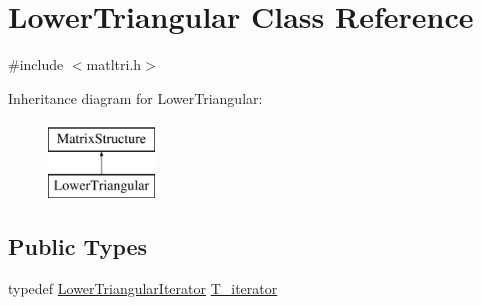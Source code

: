 \hypertarget{classLowerTriangular}{}\section{Lower\+Triangular Class Reference}
\label{classLowerTriangular}


{\ttfamily \#include $<$matltri.\+h$>$}

Inheritance diagram for Lower\+Triangular\+:\begin{figure}[H]
\begin{center}
\leavevmode
\includegraphics[height=2.000000cm]{classLowerTriangular}
\end{center}
\end{figure}
\subsection*{Public Types}
\begin{DoxyCompactItemize}
\item 
typedef \hyperlink{classLowerTriangularIterator}{Lower\+Triangular\+Iterator} \hyperlink{classLowerTriangular_ad2f4644d5de76f582810385ccfd2b176}{T\+\_\+iterator}
\end{DoxyCompactItemize}
